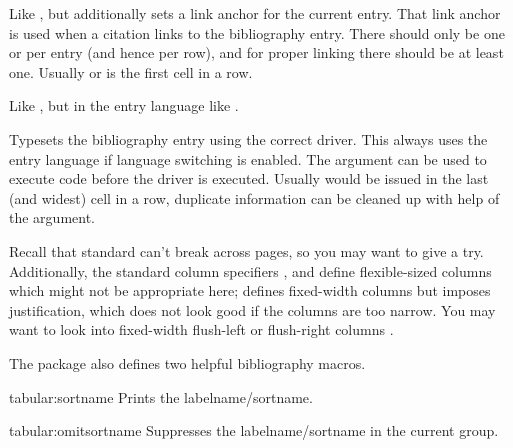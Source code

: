 \documentclass[DIV=9]{scrartcl}
\makeatletter
\newenvironment*{keymarglistbook}
  {\marglist
   \setlength{\itemsep}{0pt}%
   \raggedright
   \let\@@item\item
   \def\keyitem[##1]{%
     \@@item[{##1}]%
     \ltd@pdfbookmark{##1}{##1}}}
  {\endmarglist}
\let\exltd@pdfbookmark\ltd@pdfbookmark
\def\ltd@pdfbookmark#1#2{%
  \phantomsection\label{exltd@itm@#1}%
  \exltd@pdfbookmark{#1}{#2}}
\makeatother
\begin{document}
\begin{ltxsyntax}

Like , but additionally sets a link anchor for the current entry.
That link anchor is used when a citation links to the bibliography entry.
There should only be one  or  per entry (and
hence per row),
and for proper linking there should be at least one.
Usually  or  is the first cell in a row.


Like , but in the entry language like .


Typesets the bibliography entry using the correct driver.
This always uses the entry language if language switching is enabled.
The  argument can be used to execute code before the driver
is executed.
Usually  would be issued in the last (and widest) cell in a row,
duplicate information can be cleaned up with help of the  argument.

Recall that standard  can't break across pages, so you may want
to give  a try.
Additionally, the standard column specifiers ,  and
 define flexible-sized columns which might not be appropriate here;
 defines fixed-width columns but imposes justification, which does
not look good if the columns are too narrow.
You may want to look into fixed-width flush-left or flush-right columns%
.
\end{ltxsyntax}

The package also defines two helpful bibliography macros.
\begin{keymarglistbook}
  \item[tabular:sortname] Prints the labelname/sortname.
  \item[tabular:omitsortname] Suppresses the labelname/sortname in the current
    group.
\end{keymarglistbook}
\end{document}
